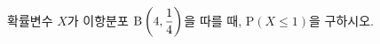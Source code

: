 확률변수 $X$가 이항분포 $\mathrm{B}\left(4{,}\mkern3mu\mathopen{}\dfrac{1}{4}\right)$을 따를 때, $\mathrm{P}(X\le 1)$을 구하시오.
